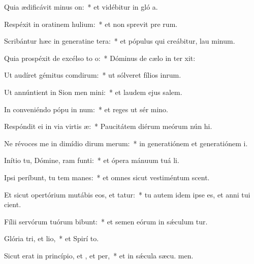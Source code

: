 \item Quia ædificávit minus on:~* et vidébitur in gló a.
\item Respéxit in oratinem hulium:~* et non sprevit pre rum.
\item Scribántur hæc in generatine tera:~* et pópulus qui creábitur, lau minum.
\item Quia prospéxit de excélso to o:~* Dóminus de cælo in ter xit:
\item Ut audíret gémitus comdirum:~* ut sólveret fílios inrum.
\item Ut annúntient in Sion men mini:~* et laudem ejus  salem.
\item In conveniéndo pópu in num:~* et reges ut sér mino.
\item Respóndit ei in via virtis æ:~* Paucitátem diérum meórum nún hi.
\item Ne révoces me in dimídio dirum merum:~* in generatiónem et generatiónem  i.
\item Inítio tu, Dómine, ram funti:~* et ópera mánuum tuá  li.
\item Ipsi períbunt, tu tem manes:~* et omnes sicut vestiméntum scent.
\item Et sicut opertórium mutábis eos, et tatur:~* tu autem idem ipse es, et anni tui  cient.
\item Fílii servórum tuórum bibunt:~* et semen eórum in sǽculum tur.
\item Glória tri, et lio,~* et Spirí to.
\item Sicut erat in princípio, et , et per,~* et in sǽcula sæcu. men.
